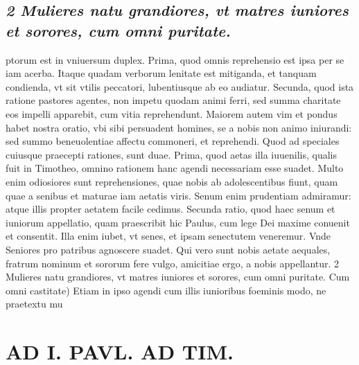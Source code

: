 \documentclass{article}
\begin{document}
\begin{pages}
\subsection*{\textit{2 Mulieres natu grandiores, vt matres iuniores et sorores, cum omni puritate.}}ptorum est in vniuersum duplex. Prima, quod omnis reprehensio est ipsa per se iam acerba. Itaque quadam verborum lenitate est mitiganda, et tanquam condienda, vt sit vtilis peccatori, lubentiusque ab eo audiatur. Secunda, quod ista ratione pastores agentes, non impetu quodam animi ferri, sed summa charitate eos impelli apparebit, cum vitia reprehendunt. Maiorem autem vim et pondus habet nostra oratio, vbi sibi persuadent homines, se a nobis non animo iniurandi: sed summo beneuolentiae affectu commoneri, et reprehendi. Quod ad speciales cuiusque praecepti rationes, sunt duae. Prima, quod aetas illa iuuenilis, qualis fuit in Timotheo, omnino rationem hanc agendi necessariam esse suadet. Multo enim odiosiores sunt reprehensiones, quae nobis ab adolescentibus fiunt, quam quae a senibus et maturae iam aetatis viris. Senum enim prudentiam admiramur: atque illis propter aetatem facile cedimus. Secunda ratio, quod haec senum et iuniorum appellatio, quam praescribit hic Paulus, cum lege Dei maxime conuenit et consentit. Illa enim iubet, vt senes, et ipsam senectutem veneremur. Vnde Seniores pro patribus agnoscere suadet. Qui vero sunt nobis aetate aequales, fratrum nominum et sororum fere vulgo, amicitiae ergo, a nobis appellantur. 2 Mulieres natu grandiores, vt matres iuniores et sorores, cum omni puritate. Cum omni castitate) Etiam in ipso agendi cum illis iunioribus foeminis modo, ne praetextu mu\pend
\section*{AD I. PAVL. AD TIM. }
\marginpar{[ p.252 ]}\pstart {}
{}

\end{pages}
\end{document}
